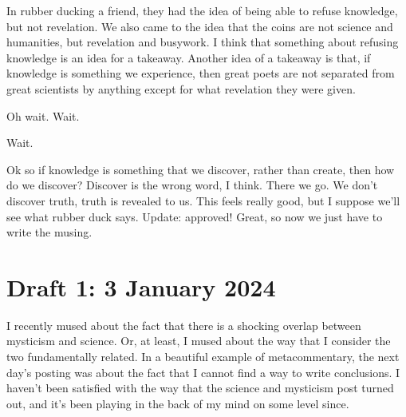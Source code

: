 \documentclass[12pt]{article}[titlepage]
\renewcommand{\,}{\textsuperscript{,}}
\begin{document}
In rubber ducking a friend,\endnotemark[4] they had the idea of being able to refuse knowledge, but not revelation.\endnotemark[5]
We also came to the idea that the coins are not science and humanities, but revelation and busywork.
I think that something about refusing knowledge is an idea for a takeaway.
Another idea of a takeaway is that, if knowledge is something we experience, then great\endnotemark[6] poets are not separated from great scientists by anything except for what revelation they were given.

Oh wait.
Wait.

Wait.

Ok so if knowledge is something that we discover, rather than create, then how do we discover?
Discover is the wrong word, I think.
There we go.
We don't discover truth, truth is revealed to us.\endnotemark[7]
This feels really good, but I suppose we'll see what rubber duck\endnotemark[8] says.
Update: approved!
Great, so now we just have to write the musing.

\endnotes
\section{Draft 1: 3 January 2024}
\endnoteversion[a] 
I recently mused about the fact that there is a shocking overlap between mysticism and science.
Or, at least, I mused about the way that I consider the two fundamentally related.
In a beautiful example of metacommentary\endnotemark[1], the next day's posting was about the fact that I cannot find a way to write conclusions.
I haven't been satisfied with the way that the science and mysticism post turned out, and it's been playing in the back of my mind on some level since.
\end{document}
